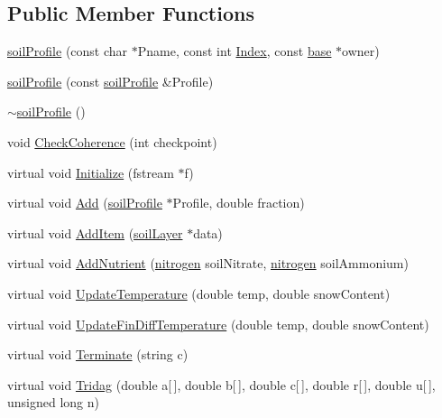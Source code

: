 \subsection*{Public Member Functions}
\begin{DoxyCompactItemize}
\item 
\hyperlink{classsoil_profile_a189f609ac4771c844111fd994bc6fdd4}{soilProfile} (const char $\ast$Pname, const int \hyperlink{classbase_afa59aaa1a0201700640234eb13a03aae}{Index}, const \hyperlink{classbase}{base} $\ast$owner)
\item 
\hyperlink{classsoil_profile_a4047f818afa5dc48f8d7abdeb85658b9}{soilProfile} (const \hyperlink{classsoil_profile}{soilProfile} \&Profile)
\item 
\hyperlink{classsoil_profile_a1af23872681bafd0ed93e666646e5f2d}{$\sim$soilProfile} ()
\item 
void \hyperlink{classsoil_profile_a720227a11c5b7d42ff847bca13ea9ed2}{CheckCoherence} (int checkpoint)
\item 
virtual void \hyperlink{classsoil_profile_af06cdd8163adae8f60c89365e242f189}{Initialize} (fstream $\ast$f)
\item 
virtual void \hyperlink{classsoil_profile_a7fd5e793b56ea8fbc1aeb79e1927565e}{Add} (\hyperlink{classsoil_profile}{soilProfile} $\ast$Profile, double fraction)
\item 
virtual void \hyperlink{classsoil_profile_a92dfd951458d1d150e642f35e135f4b3}{AddItem} (\hyperlink{classsoil_layer}{soilLayer} $\ast$data)
\item 
virtual void \hyperlink{classsoil_profile_aabd57b1bc75b4960731ed99fb01adba5}{AddNutrient} (\hyperlink{classnitrogen}{nitrogen} soilNitrate, \hyperlink{classnitrogen}{nitrogen} soilAmmonium)
\item 
virtual void \hyperlink{classsoil_profile_a5631b093b7853056cc794818132aa4f5}{UpdateTemperature} (double temp, double snowContent)
\item 
virtual void \hyperlink{classsoil_profile_a11708c4ea232e4ba78ba3b7cf425853c}{UpdateFinDiffTemperature} (double temp, double snowContent)
\item 
virtual void \hyperlink{classsoil_profile_a63e938ce16657be6fbff5eb6a6b63791}{Terminate} (string c)
\item 
virtual void \hyperlink{classsoil_profile_a97afe4fe7935e3f3fa732f8fe20f6730}{Tridag} (double a\mbox{[}$\,$\mbox{]}, double b\mbox{[}$\,$\mbox{]}, double c\mbox{[}$\,$\mbox{]}, double r\mbox{[}$\,$\mbox{]}, double u\mbox{[}$\,$\mbox{]}, unsigned long n)
\item 

\end{DoxyCompactItemize}
